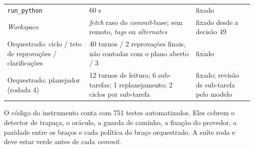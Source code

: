 \begin{table}[t]
\begin{tabular}{p{4.8cm}p{4.6cm}p{5.6cm}}
\texttt{run\_python} & 60 s & fixado \\
\textit{Workspace} & \textit{fetch} raso do \textit{commit}-base; sem remoto, \textit{tags} ou \textit{alternates} & fixado desde a decisão 49 \\
Orquestrado: ciclo / teto de reprovações / clarificações & 40 turnos / 2 reprovações finais, não contadas com o plano aberto / 3 & fixado \\
Orquestrado: planejador (rodada 4) & 12 turnos de leitura; 6 sub-tarefas; 1 replanejamento; 2 ciclos por sub-tarefa & fixado; revisão de sub-tarefa pelo modelo \\
\bottomrule
\end{tabular}
\end{table}

O código do instrumento conta com 751 testes automatizados. Eles cobrem o detector de trapaça, o oráculo, a guarda de caminho, a fixação do provedor, a paridade entre os braços e cada política do braço orquestrado. A suíte roda e deve estar verde antes de cada \textit{commit}.

